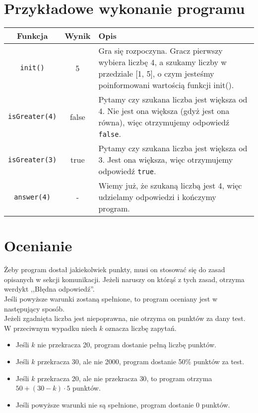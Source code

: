 \documentclass{spiral}
\begin{document}
\section{Przykładowe wykonanie programu}
    \begin{tabular}{|c|c|p{12.5cm}|}
        \hline

        \textbf{Funkcja} & \textbf{Wynik} & \textbf{Opis} \\ \hline

        \texttt{init()} & 5 &
        Gra się rozpoczyna. Gracz pierwszy wybiera liczbę 4,
        a szukamy liczby w przedziale [1, 5], o czym jesteśmy poinformowani
        wartością funkcji init().
        \\ \hline

        \texttt{isGreater(4)} & false &
        Pytamy czy szukana liczba jest większa od 4.
        Nie jest ona większa (gdyż jest ona równa),
        więc otrzymujemy odpowiedź \texttt{false}. 
        \\ \hline

        \texttt{isGreater(3)} & true &
        Pytamy czy szukana liczba jest większa od 3.
        Jest ona większa, więc otrzymujemy odpowiedź \texttt{true}. 
        \\ \hline

        \texttt{answer(4)} & - &
        Wiemy już, że szukaną liczbą jest 4,
        więc udzielamy odpowiedzi i kończymy program.
        \\ \hline
    \end{tabular}

\section{Ocenianie}
    Żeby program dostał jakiekolwiek punkty,
    musi on stosować się do zasad opisanych w sekcji komunikacji.
    Jeżeli naruszy on którąś z tych zasad, otrzyma werdykt ,,Błędna odpowiedź''.\\
    Jeśli powyższe warunki zostaną spełnione,
    to program oceniany jest w następujący sposób.\\
    Jeżeli zgadnięta liczba jest niepoprawna,
    nie otrzyma on punktów za dany test.\\
    W przeciwnym wypadku niech $k$ oznacza liczbę zapytań.
    \begin{itemize}
        \item Jeśli $k$ nie przekracza 20, program dostanie pełną liczbę punktów.
        \item Jeśli $k$ przekracza 30, ale nie 2000,
            program dostanie 50\% punktów za test.
        \item Jeśli $k$ przekracza 20, ale nie przekracza $30$, to program otrzyma
            $50 + (30 - k) \cdot 5$ punktów.
        \item Jeśli powyższe warunki nie są spełnione, program dostanie 0 punktów.
    \end{itemize}
\end{document}
